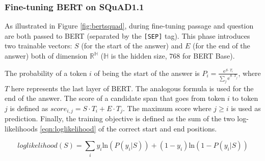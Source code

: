 \subsubsection{Fine-tuning BERT on SQuAD1.1}
As illustrated in Figure \ref{fig:bertsquad}, during fine-tuning passage and question are both passed to BERT (separated by the \texttt{[SEP]} tag). This phase introduces two trainable vectors: $S$ (for the start of the answer) and $E$ (for the end of the answer) both of dimension $\mathbb{R}^\mathbb{H}$ ($\mathbb{H}$ is the hidden size, $768$ for BERT Base). 

The probability of a token $i$ of being the start of the answer is $P_{i} = \frac{\mathrm{e}^{S \cdot T_{i}}}{\sum_{j} \mathrm{e}^{S \cdot T_{j}}}$, where $T$ here represents the last layer of BERT. The analogous formula is used for the end of the answer. The score of a candidate span that goes from token $i$ to token $j$ is defined as $score_{i, j} = S \cdot T_{i} + E \cdot T_{j}$. The maximum score where $j \geq i$ is used as prediction. Finally, the training objective is defined as the sum of the two log-likelihoods \eqref{eqn:loglikelihood} of the correct start and end positions. 

\begin{equation}
\label{eqn:loglikelihood}
loglikelihood(S) = \sum_{i} y_{i} \mathrm{ln} (P(y_{i} | S)) + (1 - y_{i}) \mathrm{ln} (1 - P(y_{i} | S))
\end{equation}
